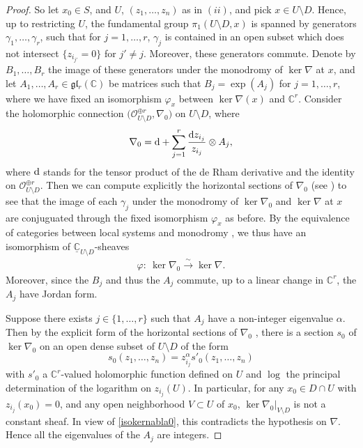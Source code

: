 \documentclass[10pt,a4paper]{amsart}
\numberwithin{equation}{section}
\begin{document}
\begin{proof}
So let $x_0\in S$, and $U$, $(z_1,\dots,z_n)$ as in $(ii)$, and pick $x\in U\setminus D$. Hence, up to restricting $U$, the fundamental group $\pi_1(U\setminus D,x)$ is spanned by generators $\gamma_1,\dots,\gamma_r$, such that for $j=1,\dots,r$, $\gamma_j$ is contained in an open subset which does not intersect $\{z_{i_{j'}}=0\}$ for $j'\neq j$. Moreover, these generators commute. Denote by $B_1,\dots,B_r$ the image of these generators under the monodromy of $\ker \nabla$ at $x$, and let $A_1,\dots,A_r\in \mathfrak{g}\mathfrak{l}_r(\mathbb{C})$ be matrices such that $B_j=\exp(A_j)$ for $j=1,\dots,r$, where we have fixed an isomorphism $\varphi_x$ between $\ker \nabla(x)$ and $\mathbb{C}^r$. Consider the holomorphic connection $\big(\mathcal{O}_{U\setminus D}^{\oplus r},\nabla_0\big)$ on $U\setminus D$, where
 \begin{gather*} \nabla_0 = {\rm d}+ \sum_{j=1}^{r} \frac{{\rm d}z_{i_j}}{z_{i_j}} \otimes A_j,
 \end{gather*}
 where ${\rm d}$ stands for the tensor product of the de Rham derivative and the identity on $\mathcal{O}_{U\setminus D}^{\oplus r}$. Then we can compute explicitly the horizontal sections of $\nabla_0$ (see \cite[p.~93]{Deligne}) to see that the image of each $\gamma_j$ under the monodromy of $\ker  \nabla_0$ and $\ker  \nabla$ at $x$ are conjuguated through the fixed isomorphism $\varphi_x$ as before. By the equivalence of categories between local systems and monodromy \cite[Chapter~I, Theorem~2.17]{Deligne}, we thus have an isomorphism of $\underline{\mathbb{C}}_{U\setminus D}$-sheaves
 \begin{gather}\label{isokernabla0} \varphi\colon\ \ker  \nabla_0 \overset{\sim}{\longrightarrow} \ker  \nabla. \end{gather}
 Moreover, since the $B_j$ and thus the $A_j$ commute, up to a linear change in $\mathbb{C}^r$, the $A_j$ have Jordan form.

Suppose there exists $j\in \{1,\dots,r\}$ such that $A_j$ have a non-integer eigenvalue $\alpha$. Then by the explicit form of the horizontal sections of $\nabla_0$ \cite[p.~93]{Deligne}, there is a section $s_0$ of $\ker  \nabla_0$ on an open dense subset of $U\setminus D$ of the form
\[s_0(z_1,\dots,z_n)=z_{i_j}^\alpha s'_0(z_1,\dots,z_n)\]
with $s'_0$ a $\mathbb{C}^r$-valued holomorphic function defined on $U$ and $\log$ the principal determination of the logarithm on $z_{i_j}(U)$. In particular, for any $x_0\in D\cap U$ with $z_{i_j}(x_0)=0$, and any open neighborhood $V\subset U$ of $x_0$, $\ker  \nabla_0|_{V\setminus D}$ is not a constant sheaf. In view of \eqref{isokernabla0}, this contradicts the hypothesis on $\nabla$. Hence all the eigenvalues of the $A_j$ are integers.


\end{proof}
\end{document}
